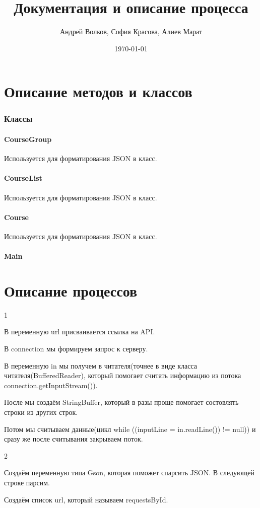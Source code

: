 \documentclass[a4paper, 12pt]{article}
\author{Андрей Волков, София Красова, Алиев Марат}
\title{Документация и описание процесса}
\date{\today}
\begin{document}
	\maketitle
	\part*{Описание методов и классов}
	\section{Классы}
	\subsection{CourseGroup}
	Используется для форматирования JSON в класс.
	\subsection{CourseList}
	Используется для форматирования JSON в класс.
	\subsection{Course}
	Используется для форматирования JSON в класс.
	\subsection{Main}
	
	
	\part*{Описание процессов}
	
	1
	
	В переменную url присваивается ссылка на API.
	
	В connection мы формируем запрос к серверу.
	
	В переменную in мы получем в читателя(точнее в виде класса читателя(BufferedReader), который помогает считать информацию из потока connection.getInputStream()).
	
	После мы создаём StringBuffer, который в разы проще помогает состовлять строки из других строк.
	
	Потом мы считываем данные(цикл while ((inputLine = in.readLine()) != null)) и сразу же после считывания закрываем поток.
	
	2
	
	Создаём переменную типа Gson, которая поможет спарсить JSON. В следующей строке парсим.
	
	Создаём список url, который называем requestsById.
	
\end{document}
